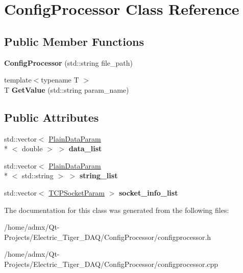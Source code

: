 \hypertarget{class_config_processor}{\section{Config\+Processor Class Reference}
\label{class_config_processor}
}
\subsection*{Public Member Functions}
\begin{DoxyCompactItemize}
\item 
\hypertarget{class_config_processor_a28b19765419c2b6ddb1b3327b711f4e7}{{\bfseries Config\+Processor} (std\+::string file\+\_\+path)}\label{class_config_processor_a28b19765419c2b6ddb1b3327b711f4e7}

\item 
\hypertarget{class_config_processor_a511cd925379b98cc4fd85d320bdb490d}{{\footnotesize template$<$typename T $>$ }\\T {\bfseries Get\+Value} (std\+::string param\+\_\+name)}\label{class_config_processor_a511cd925379b98cc4fd85d320bdb490d}

\end{DoxyCompactItemize}
\subsection*{Public Attributes}
\begin{DoxyCompactItemize}
\item 
\hypertarget{class_config_processor_a28ccb85933245a036982ab22a3138b17}{std\+::vector$<$ \hyperlink{struct_plain_data_param}{Plain\+Data\+Param}\\*
$<$ double $>$ $>$ {\bfseries data\+\_\+list}}\label{class_config_processor_a28ccb85933245a036982ab22a3138b17}

\item 
\hypertarget{class_config_processor_a9401084ab2e2cd556eb1c3844eefd273}{std\+::vector$<$ \hyperlink{struct_plain_data_param}{Plain\+Data\+Param}\\*
$<$ std\+::string $>$ $>$ {\bfseries string\+\_\+list}}\label{class_config_processor_a9401084ab2e2cd556eb1c3844eefd273}

\item 
\hypertarget{class_config_processor_a7f9bacfd051f7f50440f1325c96a99e6}{std\+::vector$<$ \hyperlink{struct_t_c_p_socket_param}{T\+C\+P\+Socket\+Param} $>$ {\bfseries socket\+\_\+info\+\_\+list}}\label{class_config_processor_a7f9bacfd051f7f50440f1325c96a99e6}

\end{DoxyCompactItemize}


The documentation for this class was generated from the following files\+:\begin{DoxyCompactItemize}
\item 
/home/admx/\+Qt-\/\+Projects/\+Electric\+\_\+\+Tiger\+\_\+\+D\+A\+Q/\+Config\+Processor/configprocessor.\+h\item 
/home/admx/\+Qt-\/\+Projects/\+Electric\+\_\+\+Tiger\+\_\+\+D\+A\+Q/\+Config\+Processor/configprocessor.\+cpp\end{DoxyCompactItemize}
